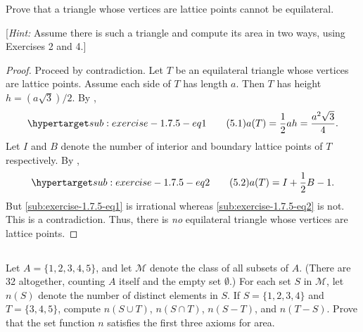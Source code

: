 \documentclass{report}
\begin{document}
  Prove that a triangle whose vertices are lattice points cannot be equilateral.

  [\textit{Hint:} Assume there is such a triangle and compute its area in two
  ways, using Exercises 2 and 4.]

  \begin{proof}
    Proceed by contradiction.
    Let $T$ be an equilateral triangle whose vertices are lattice points.
    Assume each side of $T$ has length $a$.
    Then $T$ has height $h = (a\sqrt{3}) / 2$.
    By ,
      \begin{equation}
        \hyperlabel{sub:exercise-1.7.5-eq1}
        \tag{5.1}
        a(T) = \frac{1}{2}ah = \frac{a^2\sqrt{3}}{4}.
      \end{equation}
    Let $I$ and $B$ denote the number of interior and boundary lattice points of
      $T$ respectively.
    By ,
      \begin{equation}
        \hyperlabel{sub:exercise-1.7.5-eq2}
        \tag{5.2}
        a(T) = I + \frac{1}{2}B - 1.
      \end{equation}
    But \eqref{sub:exercise-1.7.5-eq1} is irrational whereas
      \eqref{sub:exercise-1.7.5-eq2} is not.
    This is a contradiction.
    Thus, there is \textit{no} equilateral triangle whose vertices are lattice
      points.
  \end{proof}

\subsection{}%

  Let $A = \{1, 2, 3, 4, 5\}$, and let $\mathscr{M}$ denote the class of all
    subsets of $A$.
  (There are 32 altogether, counting $A$ itself and the empty set $\emptyset$.)
  For each set $S$ in $\mathscr{M}$, let $n(S)$ denote the number of distinct
    elements in $S$.
  If $S = \{1, 2, 3, 4\}$ and $T = \{3, 4, 5\}$, compute $n(S \cup T)$,
    $n(S \cap T)$, $n(S - T)$, and $n(T - S)$.
  Prove that the set function $n$ satisfies the first three axioms for area.
\end{document}

